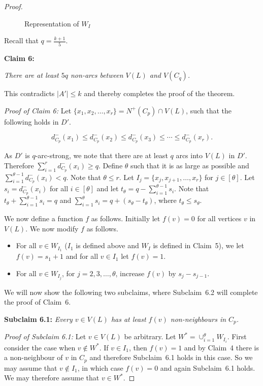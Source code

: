 \documentclass{article}
\newcommand{\2}{\vspace{2mm}}
\theoremstyle{plain}
\theoremstyle{definition}
\begin{document}
\begin{proof}
\begin{figure}
\begin{tikzpicture}
\end{tikzpicture}
\caption{Representation of $W_I$} \label{fig:claim5}
\end{figure}

\2

Recall that $q=\frac{k+1}{5}$.

{\bf Claim 6:} {\em There are at least $5q$ non-arcs between $V(L)$ and $V(C_q)$. 

This contradicts $|A'| \leq k$ and thereby completes the proof of the theorem.}

\2

{\em Proof of Claim 6:} Let $\{x_1,x_2,\ldots,x_r\} = N^+(C_p) \cap V(L)$, such that the following holds in $D'$.

\[
d_{C_p}^-(x_1) \leq d_{C_p}^-(x_2) \leq d_{C_p}^-(x_3) \leq \cdots \leq d_{C_p}^-(x_r).
\]

As $D'$ is $q$-arc-strong, we note that there are at least $q$ arcs into $V(L)$ in $D'$.
Therefore $\sum_{i=1}^{r} d_{C_p}^-(x_i) \geq q$.
Define $\theta$ such that it is as large as possible and $\sum_{i=1}^{\theta-1} d_{C_p}^-(x_i) < q$.
Note that $\theta \leq r$.  Let $I_j = \{x_j, x_{j+1}, \ldots, x_r\}$ for $j \in [\theta]$.
Let $s_i = d_{C_p}^-(x_i)$ for all $i \in [\theta]$ and let $t_{\theta} = q - \sum_{i=1}^{\theta-1} s_i$.
Note that $t_{\theta} + \sum_{i=1}^{\theta-1} s_i = q$ and $\sum_{i=1}^{\theta} s_i = q + (s_{\theta}-t_{\theta})$, where $t_{\theta} \leq s_{\theta}$.

We now define a function $f$ as follows.  Initially let $f(v)=0$ for all vertices $v$ in $V(L)$.  
We now modify $f$ as follows.

\begin{itemize}
\item For all $v \in W_{I_1}$ ($I_1$ is defined above and $W_I$ is defined in Claim~5), we let $f(v) = s_1+1$
and for all $v \in I_1$ let $f(v)=1$.
\item For all $v \in W_{I_j}$, for $j=2,3,\ldots,\theta$, increase $f(v)$ by $s_j - s_{j-1}$.
\end{itemize}

We will now show the following two subclaims, where Subclaim~6.2 will complete the proof of Claim~6.

\2

{\bf Subclaim 6.1:} {\em Every $v \in V(L)$ has at least $f(v)$ non-neighbours in $C_p$.}

\2

{\em Proof of Subclaim 6.1:} Let $v \in V(L)$ be arbitrary.  Let $W^* = \cup_{i=1}^{\theta} W_{I_i}$. 
First consider the case when $v \not\in W^*$. If $v \in I_1$, then $f(v)=1$ and by Claim~4  
there is a non-neighbour of $v$ in $C_p$ and therefore Subclaim~6.1 holds in this case.  So we may assume that 
$v \not\in I_1$, in which case $f(v)=0$ and again Subclaim~6.1 holds. We may therefore assume that
$v \in W^*$.


\end{proof}
\end{document}
